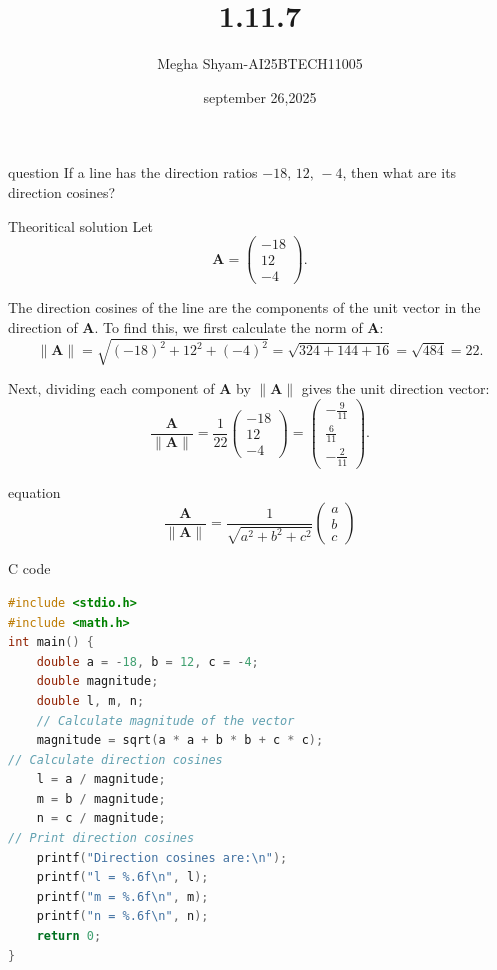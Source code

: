 \documentclass{beamer}
\title %
{1.11.7}
\date{september 26,2025}
\author %
{Megha Shyam-AI25BTECH11005}
\begin{document}
\begin{frame}{question}
If a line has the direction ratios $-18,\, 12,\, -4$, then what are its direction cosines?
\end{frame}
\begin{frame}{Theoritical solution}
 Let
\[
\mathbf{A} = \begin{pmatrix}
-18 \\
12 \\
-4
\end{pmatrix}.
\]

The direction cosines of the line are the components of the unit vector in the direction of $\mathbf{A}$. To find this, we first calculate the norm of $\mathbf{A}$:
\[
\|\mathbf{A}\| = \sqrt{(-18)^2 + 12^2 + (-4)^2} = \sqrt{324 + 144 + 16} = \sqrt{484} = 22.
\]

Next, dividing each component of $\mathbf{A}$ by $\|\mathbf{A}\|$ gives the unit direction vector:
\[
\frac{\mathbf{A}}{\|\mathbf{A}\|} = \frac{1}{22} \begin{pmatrix}
-18 \\
12 \\
-4
\end{pmatrix} = \begin{pmatrix}
-\frac{9}{11} \\
\frac{6}{11} \\
-\frac{2}{11}
\end{pmatrix}.
\]


\end{frame}
\begin{frame}{equation}
\[
\frac{\mathbf{A}}{\|\mathbf{A}\|} = \frac{1}{\sqrt{a^2 + b^2 + c^2}} \begin{pmatrix}
a \\
b \\
c
\end{pmatrix}
\]

    
\end{frame}
\begin{frame}[fragile]{C code}
\begin{lstlisting}[language=C]
#include <stdio.h>
#include <math.h>
int main() {
    double a = -18, b = 12, c = -4;
    double magnitude;
    double l, m, n;
    // Calculate magnitude of the vector
    magnitude = sqrt(a * a + b * b + c * c);
// Calculate direction cosines
    l = a / magnitude;
    m = b / magnitude;
    n = c / magnitude;
// Print direction cosines
    printf("Direction cosines are:\n");
    printf("l = %.6f\n", l);
    printf("m = %.6f\n", m);
    printf("n = %.6f\n", n);
    return 0;
}
\end{lstlisting}
\end{frame}
\end{document}
